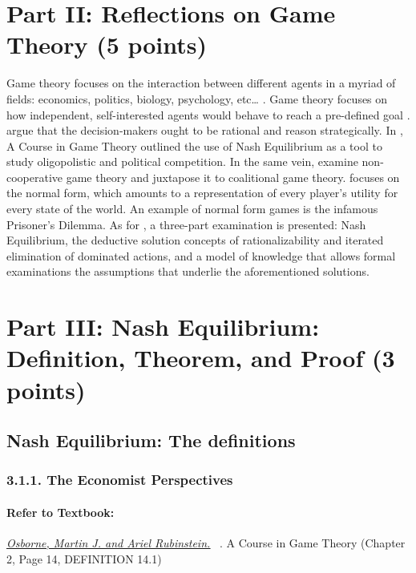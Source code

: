 \documentclass[runningheads]{llncs}
\begin{document}
\section{Part II: Reflections on Game Theory (5 points)}

\begin{par}
Game theory focuses on the interaction between different agents in a myriad of fields: economics, politics, biology, psychology, etc… \cite{mas}. Game theory focuses on how independent, self-interested agents would behave to reach a pre-defined goal \cite{mas,cgt}. \citeauthor{cgt} argue that the decision-makers ought to be rational and reason strategically. In \citeyear{cgt}, A Course in Game Theory outlined the use of Nash Equilibrium as a tool to study oligopolistic and political
competition. In the same vein, \citet{mas} examine non-cooperative game theory and juxtapose it to coalitional game theory.
\citeauthor{mas} focuses on the normal form, which amounts to a representation of every player’s utility for every state of the world. An example of normal form games is the infamous Prisoner's Dilemma. As for \citet{cgt}, a three-part examination is presented: Nash Equilibrium, the deductive solution concepts of rationalizability and iterated elimination
of dominated actions, and a model of knowledge that allows
formal examinations the assumptions that underlie the aforementioned solutions.
\end{par}


\section{Part III: Nash Equilibrium: Definition, Theorem, and Proof (3 points)}


\subsection{Nash Equilibrium: The definitions}
\subsubsection{3.1.1. The Economist Perspectives}
\paragraph{Refer to Textbook:} 
\href{https://www.sciencedirect.com/science/article/pii/S0899825699907236}{\textit{\underline{Osborne, Martin J. and Ariel Rubinstein.}}}~
\citeyear{osborne1994course}. A Course in Game Theory (Chapter 2, Page 14, DEFINITION 14.1)
\end{document}
